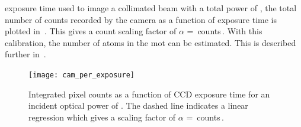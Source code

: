 exposure time used to image a collimated beam with a total power of
, the total number of counts recorded by the camera
as a function of exposure time is plotted in~. This
gives a count scaling factor of \(\alpha\) =
\,counts\,\sivalue{}{\per\micro\second\per\micro\watt}.
With this calibration, the number of atoms in the \ac{mot} can be
estimated. This is described further
in~.
\begin{figure}[!htbp]
	\centering
	\texttt{[image: cam\_per\_exposure]}
	\caption[Integrated pixel counts as a function of CCD exposure
		time.]{Integrated pixel counts as a function of CCD exposure time for an
		incident optical power of . The dashed line
		indicates a linear regression which gives a scaling factor of \(\alpha\)
		=
		\,counts\,\sivalue{}{\per\micro\second\per\micro\watt}.}
	\label{fig:camera_counts}
\end{figure}

